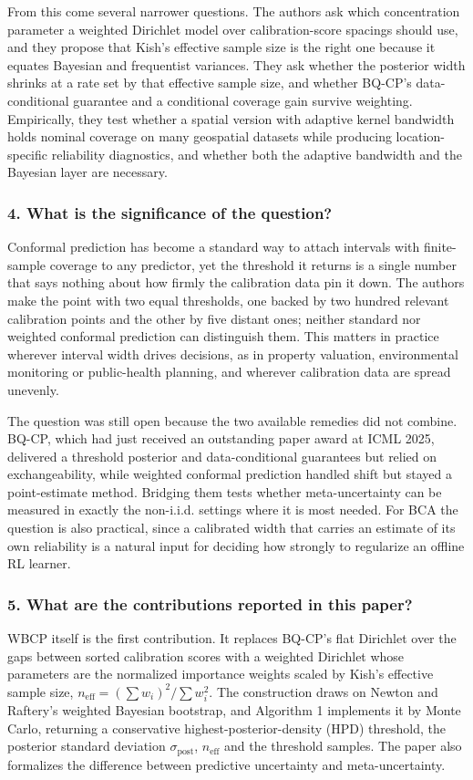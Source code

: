 \documentclass[11pt]{article}
\newcommand{\question}[1]{\subsubsection*{#1}}
\begin{document}
From this come several narrower questions. The authors ask which concentration parameter a weighted Dirichlet model over calibration-score spacings should use, and they propose that Kish's effective sample size is the right one because it equates Bayesian and frequentist variances. They ask whether the posterior width shrinks at a rate set by that effective sample size, and whether BQ-CP's data-conditional guarantee and a conditional coverage gain survive weighting. Empirically, they test whether a spatial version with adaptive kernel bandwidth holds nominal coverage on many geospatial datasets while producing location-specific reliability diagnostics, and whether both the adaptive bandwidth and the Bayesian layer are necessary.

\question{4. What is the significance of the question?}

Conformal prediction has become a standard way to attach intervals with finite-sample coverage to any predictor, yet the threshold it returns is a single number that says nothing about how firmly the calibration data pin it down. The authors make the point with two equal thresholds, one backed by two hundred relevant calibration points and the other by five distant ones; neither standard nor weighted conformal prediction can distinguish them. This matters in practice wherever interval width drives decisions, as in property valuation, environmental monitoring or public-health planning, and wherever calibration data are spread unevenly.

The question was still open because the two available remedies did not combine. BQ-CP, which had just received an outstanding paper award at ICML 2025, delivered a threshold posterior and data-conditional guarantees but relied on exchangeability, while weighted conformal prediction handled shift but stayed a point-estimate method. Bridging them tests whether meta-uncertainty can be measured in exactly the non-i.i.d. settings where it is most needed. For BCA the question is also practical, since a calibrated width that carries an estimate of its own reliability is a natural input for deciding how strongly to regularize an offline RL learner.

\question{5. What are the contributions reported in this paper?}

WBCP itself is the first contribution. It replaces BQ-CP's flat Dirichlet over the gaps between sorted calibration scores with a weighted Dirichlet whose parameters are the normalized importance weights scaled by Kish's effective sample size, $n_{\mathrm{eff}} = (\sum w_i)^2/\sum w_i^2$. The construction draws on Newton and Raftery's weighted Bayesian bootstrap, and Algorithm 1 implements it by Monte Carlo, returning a conservative highest-posterior-density (HPD) threshold, the posterior standard deviation $\sigma_{\mathrm{post}}$, $n_{\mathrm{eff}}$ and the threshold samples. The paper also formalizes the difference between predictive uncertainty and meta-uncertainty.
\end{document}

